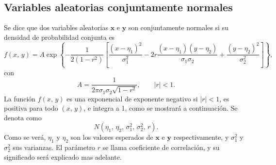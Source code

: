 \documentclass[a4paper]{report}
\newcommand{\x}{\mathbf{x}}
\newcommand{\y}{\mathbf{y}}
\begin{document}
\subsection{Variables aleatorias conjuntamente normales}\label{sec:joint_normal_pdf}

Se dice que dos variables aleatorias \(\x\) e \(\y\) son conjuntamente normales si su densidad de probabilidad conjunta es
\begin{equation}\label{eq:joint_normal_pdf1}
 f(x,\,y)=A\exp\left\{-\frac{1}{2(1-r^2)}\left[\frac{(x-\eta_1)^2}{\sigma_1^2}-2r\frac{(x-\eta_1)(y-\eta_2)}{\sigma_1\sigma_2}+\frac{(y-\eta_2)^2}{\sigma_2^2}\right]\right\},
\end{equation}
con
\begin{equation}\label{eq:joint_normal_pdf2}
 A=\frac{1}{2\pi\sigma_1\sigma_2\sqrt{1-r^2}},\qquad|r|<1.
\end{equation}
La función \(f(x,\,y)\) es una exponencial de exponente negativo si \(|r|<1\), es positiva para todo \((x,\,y)\), e integra a 1, como se mostrará a continuación. Se denota como
\[
 N(\eta_1,\,\eta_2,\,\sigma_1^2,\,\sigma_2^2,\,r).
\]
Como se verá, \(\eta_1\) y \(\eta_2\) son los valores esperados de \(\x\) e \(\y\) respectivamente, y \(\sigma_1^2\) y \(\sigma_2^2\) sus varianzas. El parámetro \(r\) se llama coeficiente de correlación, y su significado será explicado mas adelante.
\end{document}
